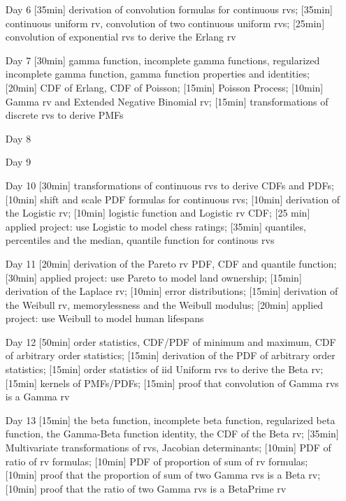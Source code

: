 \begin{enumerate}
\item[Day 6] [35min] derivation of convolution formulas for continuous rvs; [35min] continuous uniform rv, convolution of two continuous uniform rvs; [25min] convolution of exponential rvs to derive the Erlang rv

\item[Day 7] [30min] gamma function, incomplete gamma functions, regularized incomplete gamma function, gamma function properties and identities; [20min] CDF of Erlang, CDF of Poisson; [15min] Poisson Process; [10min] Gamma rv and Extended Negative Binomial rv; [15min] transformations of discrete rvs to derive PMFs


\item[Day 8] 
\item[Day 9] 

\item[Day 10] [30min] transformations of continuous rvs to derive CDFs and PDFs; [10min] shift and scale PDF formulas for continuous rvs; [10min] derivation of the Logistic rv; [10min] logistic function and Logistic rv CDF; [25 min] applied project: use Logistic to model chess ratings; [35min] quantiles, percentiles and the median, quantile function for continous rvs


\item[Day 11] [20min] derivation of the Pareto rv PDF, CDF and quantile function; [30min] applied project: use Pareto to model land ownership; [15min] derivation of the Laplace rv; [10min] error distributions; [15min] derivation of the Weibull rv, memorylessness and the Weibull modulus; [20min] applied project: use Weibull to model human lifespans

\item[Day 12] [50min] order statistics, CDF/PDF of minimum and maximum, CDF of arbitrary order statistics; [15min] derivation of the PDF of arbitrary order statistics; [15min] order statistics of iid Uniform rvs to derive the Beta rv; [15min] kernels of PMFs/PDFs; [15min] proof that convolution of Gamma rvs is a Gamma rv

\item[Day 13]  [15min] the beta function, incomplete beta function, regularized beta function, the Gamma-Beta function identity, the CDF of the Beta rv; [35min] Multivariate transformations of rvs, Jacobian determinants; [10min] PDF of ratio of rv formulas; [10min] PDF of proportion of sum of rv formulas; [10min] proof that the proportion of sum of two Gamma rvs is a Beta rv; [10min] proof that the ratio of two Gamma rvs is a BetaPrime rv


\end{enumerate}
